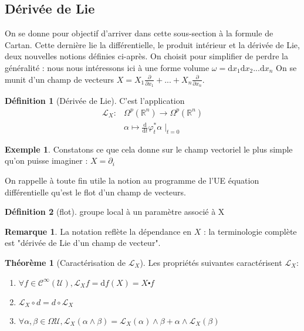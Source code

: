 \documentclass{article}
\newcommand{\R}{\mathbb{R}} %
\theoremstyle{definition} %
\newtheorem{defi}{Définition}
\newtheorem{rmq}{Remarque}
\newtheorem{thm}{Théorème}
\newtheorem{ex}{Exemple}
\newcommand{\OM}[1]{\Omega^{#1} (\R^n)}
\newcommand{\derp}[2]{\frac{\partial {#1}}{\partial {#2}}}
\newcommand{\rond}{\circ}
\newcommand{\dd}{ \mathrm{d}}
\newcommand{\1}{\mathbb{1}} %
\newcommand{\loi}{\mathcal{L}} %
\begin{document}
\subsection{Dérivée de Lie}

On se donne pour objectif d'arriver dans cette sous-section à la formule de Cartan.
Cette dernière lie la différentielle, le produit intérieur et la dérivée de Lie, deux nouvelles notions définies ci-après.
On choisit pour simplifier de perdre la généralité : nous nous intéressons ici à une forme volume $\omega = \dd x_1 \dd x_2 ... \dd x_n$
On se munit d'un champ de vecteurs $X=X_1 \derp{}{x_1} + ... + X_n \derp{}{x_n}$.


\begin{defi}[Dérivée de Lie]
    C'est l'application
    \begin{align*} \loi_X : & \OM{p} \to \OM{p} \\
        & \alpha \mapsto \frac{\dd}{\dd t} \varphi_t^* \alpha \mid_{t=0}
    \end{align*}
\end{defi}

\begin{ex}
Constatons ce que cela donne sur le champ vectoriel le plus simple qu'on puisse imaginer : $X = \partial_i$

\end{ex}

On rappelle à toute fin utile la notion au programme de l'UE équation différentielle qu'est le flot d'un champ de vecteurs.

\begin{defi}[flot]
    groupe local à un paramètre associé à X
\end{defi}

\begin{rmq}
La notation reflète la dépendance en $X$ : la terminologie complète est "dérivée de Lie d'un champ de vecteur".
\end{rmq}

\begin{thm}[Caractérisation de $\loi_X$]
    Les propriétés suivantes caractérisent $\loi_X$:
    \begin{enumerate}
        \item $\forall f \in \mathcal{C}^\infty(\mathcal{U}), \loi_X f = \dd f (X) = X \centerdot f$
        \item $\loi_X \rond d = d \rond \loi_X $
        \item $ \forall \alpha , \beta \in \Omega{\mathcal{U}}, \loi_X (\alpha \wedge \beta) = \loi_X (\alpha) \wedge  \beta + \alpha \wedge \loi_X (\beta)$
    \end{enumerate}
\end{thm}
\end{document}
